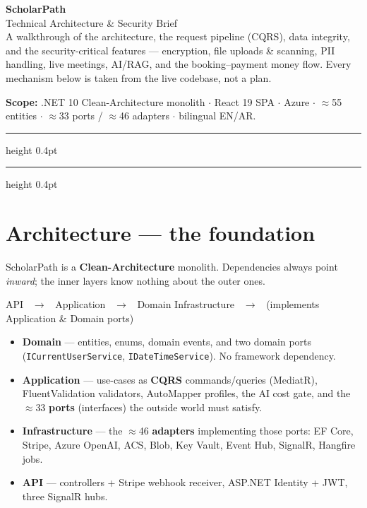 \documentclass[11pt,a4paper]{article}
\newcommand{\code}[1]{\texttt{\textcolor{spInk}{#1}}}
\begin{document}
\begin{tcolorbox}[colback=spPrimary,colframe=spPrimary,arc=4pt,boxrule=0pt]
  \color{white}
  {\Huge\bfseries ScholarPath}\\[2pt]
  {\LARGE Technical Architecture \& Security Brief}\\[6pt]
  {\normalsize A walkthrough of the architecture, the request pipeline (CQRS),
  data integrity, and the security-critical features --- encryption, file
  uploads \& scanning, PII handling, live meetings, AI/RAG, and the
  booking--payment money flow. Every mechanism below is taken from the live
  codebase, not a plan.}
\end{tcolorbox}

\vspace{4pt}
{\small\color{spInk}\textbf{Scope:} .NET 10 Clean-Architecture monolith $\cdot$
React 19 SPA $\cdot$ Azure $\cdot$ $\approx$55 entities $\cdot$ $\approx$33 ports /
$\approx$46 adapters $\cdot$ bilingual EN/AR.}

\vspace{2pt}\hrule height 0.4pt\vspace{6pt}
{\small\tableofcontents}
\vspace{4pt}\hrule height 0.4pt

\section{Architecture --- the foundation}

ScholarPath is a \textbf{Clean-Architecture} monolith. Dependencies always point
\emph{inward}; the inner layers know nothing about the outer ones.

\begin{center}\small\ttfamily
API \ $\rightarrow$ \ Application \ $\rightarrow$ \ Domain \qquad
Infrastructure \ $\rightarrow$ \ (implements Application \& Domain ports)
\end{center}

\begin{itemize}
\item \textbf{Domain} --- entities, enums, domain events, and two domain ports
  (\code{ICurrentUserService}, \code{IDateTimeService}). No framework dependency.
\item \textbf{Application} --- use-cases as \textbf{CQRS} commands/queries (MediatR),
  FluentValidation validators, AutoMapper profiles, the AI cost gate, and the
  $\approx$33 \textbf{ports} (interfaces) the outside world must satisfy.
\item \textbf{Infrastructure} --- the $\approx$46 \textbf{adapters} implementing
  those ports: EF Core, Stripe, Azure OpenAI, ACS, Blob, Key Vault, Event Hub,
  SignalR, Hangfire jobs.
\item \textbf{API} --- controllers + Stripe webhook receiver, ASP.NET Identity +
  JWT, three SignalR hubs.
\end{itemize}
\end{document}
